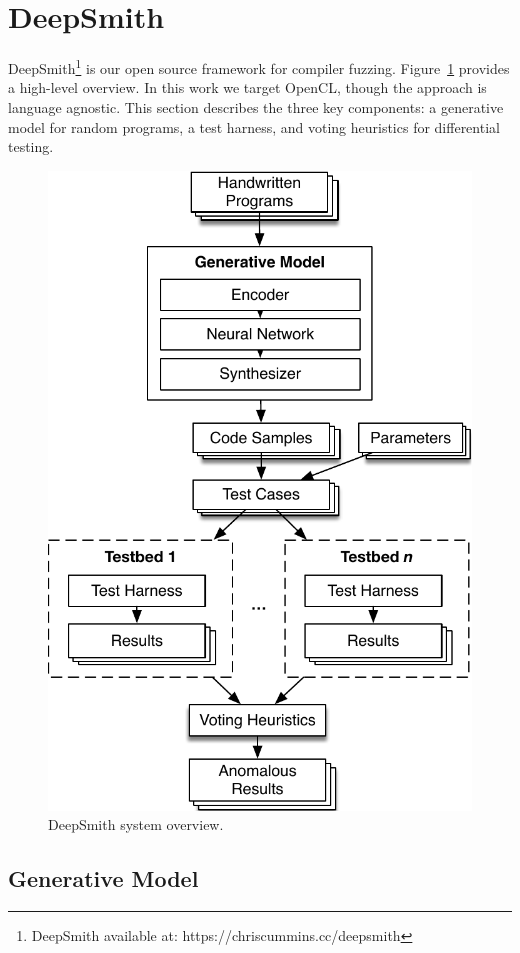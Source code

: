 \section{DeepSmith}

DeepSmith\footnote{DeepSmith available at: https://chriscummins.cc/deepsmith} is
our open source framework for compiler fuzzing. Figure~\ref{fig:deeptune}
provides a high-level overview. In this work we target OpenCL, though the
approach is language agnostic. This section describes the three key components:
a generative model for random programs, a test harness, and voting heuristics
for differential testing.

\begin{figure}
  \centering
  \includegraphics[width=.75\columnwidth]{img/deepsmith}
  \vspace{-1em}
  \caption{%
    DeepSmith system overview.
    \vspace{-1em}
  }%
  \label{fig:deeptune}
\end{figure}

\subsection{Generative Model}

